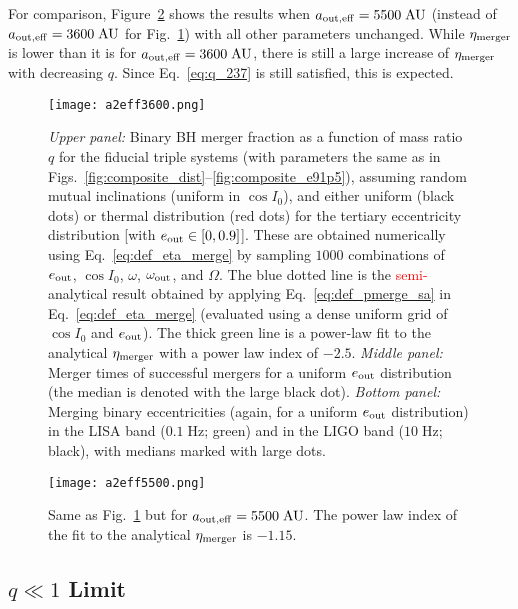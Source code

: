 \documentclass[
        fleqn,
        usenatbib,
    ]{mnras}
\begin{document}
For comparison, Figure~\ref{fig:popsynth5500} shows the results when
$a_{\rm out, eff} = 5500\;\mathrm{AU}$ (instead of $a_{\rm out, eff} =
3600\;\mathrm{AU}$ for Fig.~\ref{fig:popsynth}) with all other parameters
unchanged. While $\eta_{\rm merger}$ is lower than it is for $a_{\rm out, eff} =
3600\;\mathrm{AU}$, there is still a large increase of $\eta_{\rm merger}$ with
decreasing $q$. Since Eq.~\eqref{eq:q_237} is still satisfied, this is expected.
\begin{figure}
    \centering
    \texttt{[image: a2eff3600.png]}
    \caption{\emph{Upper panel:} Binary BH merger fraction as a function of mass
    ratio $q$ for the fiducial triple systems (with parameters the same as in
    Figs.~\ref{fig:composite_dist}--\ref{fig:composite_e91p5}), assuming random
    mutual inclinations (uniform in $\cos I_0$), and either uniform (black dots)
    or thermal distribution (red dots) for the tertiary eccentricity
    distribution [with $e_{\rm out} \in [0,0.9]$]. These are obtained
    numerically using Eq.~\eqref{eq:def_eta_merge} by sampling $1000$
    combinations of $e_{\rm out}$, $\cos I_0$, $\omega$, $\omega_{\rm out}$, and
    $\Omega$. The blue dotted line is the \textcolor{red}{semi-}analytical
    result obtained by applying Eq.~\eqref{eq:def_pmerge_sa} in
    Eq.~\eqref{eq:def_eta_merge} (evaluated using a dense uniform grid of $\cos
    I_0$ and $e_{\rm out}$). The thick green line is a power-law fit to the
    analytical $\eta_{\rm merger}$ with a power law index of $-2.5$.
    \emph{Middle panel:} Merger times of successful mergers for a uniform
    $e_{\rm out}$ distribution (the median is denoted with the large black dot).
    \emph{Bottom panel:} Merging binary eccentricities (again, for a uniform
    $e_{\rm out}$ distribution) in the LISA band ($0.1\;\mathrm{Hz}$; green) and
    in the LIGO band ($10 \;\mathrm{Hz}$; black), with medians marked with large
    dots. }\label{fig:popsynth}
\end{figure}
\begin{figure}
    \centering
    \texttt{[image: a2eff5500.png]}
    \caption{Same as Fig.~\ref{fig:popsynth} but for $a_{\rm out, eff} =
    5500\;\mathrm{AU}$. The power law index of the fit to the
    analytical $\eta_{\rm merger}$ is $-1.15$. }\label{fig:popsynth5500}
\end{figure}

\subsection{$q \ll 1$ Limit}
\end{document}
